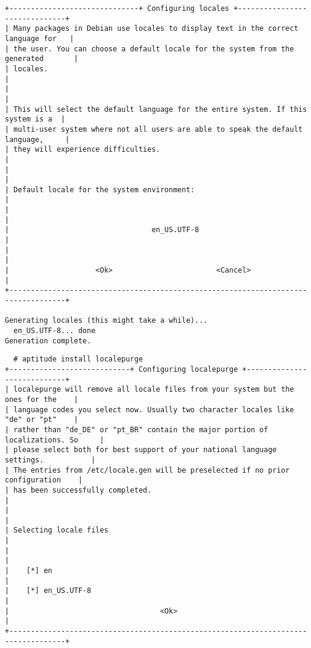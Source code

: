 {
\scriptsize
\linespread{1}
\begin{verbatim}
+------------------------------+ Configuring locales +------------------------------+
| Many packages in Debian use locales to display text in the correct language for   |
| the user. You can choose a default locale for the system from the generated       |
| locales.                                                                          |
|                                                                                   |
| This will select the default language for the entire system. If this system is a  |
| multi-user system where not all users are able to speak the default language,     |
| they will experience difficulties.                                                |
|                                                                                   |
| Default locale for the system environment:                                        |
|                                                                                   |
|                                 en_US.UTF-8                                       |
|                                                                                   |
|                    <Ok>                        <Cancel>                           |
+-----------------------------------------------------------------------------------+

Generating locales (this might take a while)...
  en_US.UTF-8... done
Generation complete.

\end{verbatim}
}

{
\scriptsize
\linespread{1}
\begin{verbatim}
  # aptitude install localepurge
+----------------------------+ Configuring localepurge +----------------------------+
| localepurge will remove all locale files from your system but the ones for the    |
| language codes you select now. Usually two character locales like "de" or "pt"    |
| rather than "de_DE" or "pt_BR" contain the major portion of localizations. So     |
| please select both for best support of your national language settings.           |
| The entries from /etc/locale.gen will be preselected if no prior configuration    |
| has been successfully completed.                                                  |
|                                                                                   |
| Selecting locale files                                                            |
|                                                                                   |
|    [*] en                                                                         |
|    [*] en_US.UTF-8                                                                |
|                                   <Ok>                                            |
+-----------------------------------------------------------------------------------+
\end{verbatim}
}

